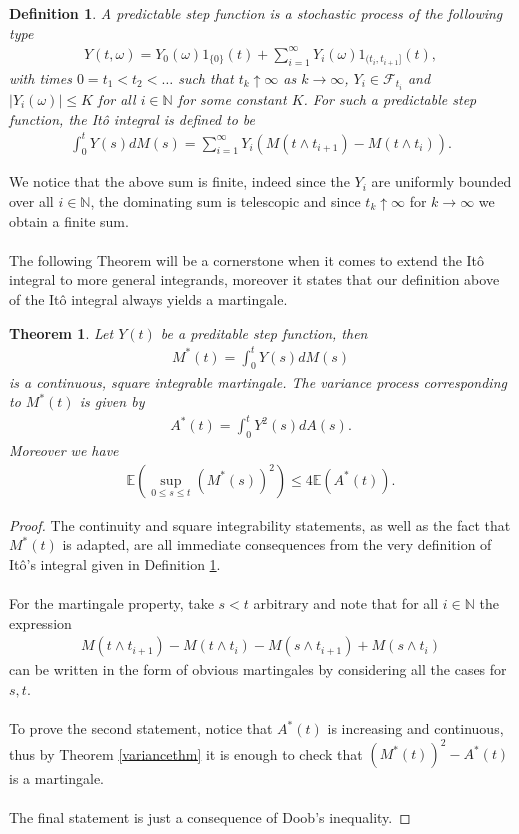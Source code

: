 \documentclass[11pt,a4paper, final]{article}
\newtheorem{thm}{Theorem}[section]
\newtheorem{defn}{Definition}[section]
\begin{document}
\begin{defn} \label{defitopredictable} A predictable step function is a stochastic process of the following type
\begin{align*}
Y(t, \omega) = Y_0 ( \omega)1_{\{0\}} (t) + \sum_{i=1}^\infty Y_i( \omega) 1_{(t_i,t_{i+1}]}(t),
\end{align*}
with times $0=t_1 < t_2 < \dots $ such that $t_k \uparrow \infty$ as $k \to \infty$, $Y_i \in \mathcal{F}_{t_i}$ and $|Y_i( \omega)| \leq K$ for all $i \in \mathbb{N}$ for some constant $K$. 
For such a predictable step function, the Itô integral is defined to be 
\begin{align*}
\int_0^t Y(s) dM(s) = \sum_{i=1}^\infty Y_i  (M(t \wedge t_{i+1}) - M(t \wedge t_i)).
\end{align*}
\end{defn}
\noindent We notice that the above sum is finite, indeed since the $Y_i$ are uniformly bounded over all $i \in \mathbb{N}$, the dominating sum is telescopic and since $t_k \uparrow \infty$ for $k \to \infty$ we obtain a finite sum.
\\
\\
The following Theorem will be a cornerstone when it comes to extend the Itô integral to more general integrands, moreover it states that our definition above of the Itô integral always yields a martingale.
\newpage
\begin{thm} \label{thminequalty} Let $Y(t)$ be a preditable step function, then
\begin{align*}
M^*(t) = \int_0^t Y(s) dM(s)
\end{align*}
is a continuous, square integrable martingale. The variance process corresponding to $M^*(t)$ is given by
\begin{align*}
A^*(t) = \int_0^t Y^2(s) dA(s).
\end{align*}
Moreover we have
\begin{align*}
\mathbb{E}\left( \sup_{0 \leq s \leq t} (M^*(s))^2 \right) \leq 4 \mathbb{E}(A^*(t)).
\end{align*}
\end{thm}
\begin{proof}
The continuity and square integrability statements, as well as the fact that $M^*(t)$ is adapted, are all immediate consequences from the very definition of Itô's integral given in Definition \ref{defitopredictable}.
\\\\
For the martingale property, take $s < t$ arbitrary and note that for all $i \in \mathbb{N}$ the expression
\begin{align*}
M(t \wedge t_{i+1}) - M(t \wedge t_i) - M (s \wedge t_{i+1}) + M( s \wedge t_i)
\end{align*}
can be written in the form of obvious martingales by considering all the cases for $s,t$. 
\\\\
To prove the second statement, notice that $A^*(t)$ is increasing and continuous, thus by Theorem \ref{variancethm} it is enough to check that $(M^*(t))^2 - A^*(t)$ is a martingale. 
\\\\
The final statement is just a consequence of Doob's inequality. 
\end{proof}
\end{document}
